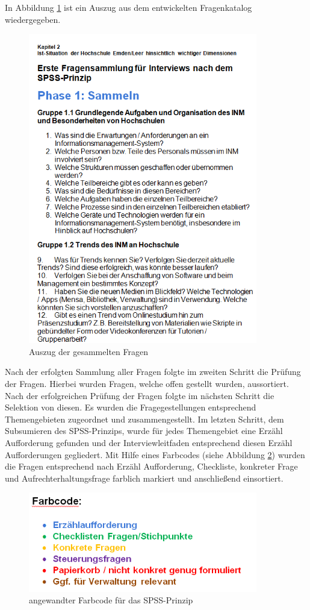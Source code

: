 In Abbildung \ref{fig_auszug_fragen_sammeln} ist ein Auszug aus dem entwickelten Fragenkatalog wiedergegeben.
\begin{figure}[h!]
	\centering
	\includegraphics[width=10cm]{kapitel/gruppe2/bilder/auszug_fragen}
	\caption{Auszug der gesammelten Fragen}
	\label{fig_auszug_fragen_sammeln}
\end{figure}
Nach der erfolgten Sammlung aller Fragen folgte im zweiten Schritt die Prüfung der Fragen. Hierbei wurden Fragen, welche offen gestellt wurden, aussortiert. Nach der erfolgreichen Prüfung der Fragen folgte im nächsten Schritt die Selektion von diesen. Es wurden die Fragegestellungen entsprechend Themengebieten zugeordnet und zusammengestellt. Im letzten Schritt, dem Subsumieren des SPSS-Prinzips, wurde für jedes Themengebiet eine Erzähl Aufforderung gefunden und der Interviewleitfaden entsprechend diesen Erzähl Aufforderungen gegliedert. Mit Hilfe eines Farbcodes (siehe Abbildung \ref{fig_farbcode_SPSS}) wurden die Fragen entsprechend nach Erzähl Aufforderung, Checkliste, konkreter Frage und Aufrechterhaltungsfrage farblich markiert und anschließend einsortiert.

\begin{figure}[h!]
	\centering
	\includegraphics[width=10cm]{kapitel/gruppe2/bilder/farbcode_spss}
	\caption{angewandter Farbcode für das SPSS-Prinzip}
	\label{fig_farbcode_SPSS}
\end{figure}

